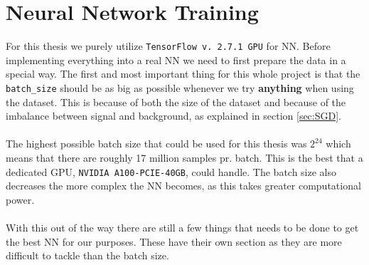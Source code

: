 \documentclass[14pt, a4paper]{book}
\begin{document}
\section{Neural Network Training}
For this thesis we purely utilize \verb|TensorFlow v. 2.7.1 GPU| for NN. Before implementing everything into a real NN we need to first prepare the data in a special way. The first and most important thing for 
this whole project is that the \verb|batch_size| should be as big as possible whenever we try \textbf{anything} when using the dataset. This is because of both the size of the dataset and because of the imbalance between signal 
and background, as explained in section \ref{sec:SGD}.\\
\\The highest possible batch size that could be used for this thesis was $2^{24}$ which means that there are roughly 17 million samples pr. batch. This is the best that a dedicated GPU, \verb|NVIDIA A100-PCIE-40GB|, could handle. 
The batch size also decreases the more complex the NN becomes, as this takes greater computational power.\\
\\With this out of the way there are still a few things that needs to be done to get the best NN for our purposes. These have their own section as they are more difficult to tackle than the batch size.
\end{document}
